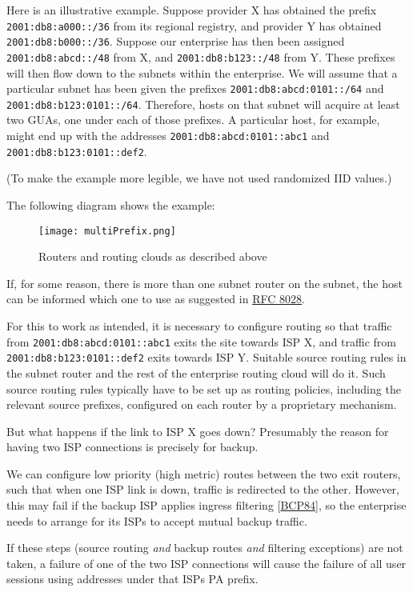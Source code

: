 \documentclass[
]{article}
\begin{document}
Here is an illustrative example. Suppose provider X has obtained the
prefix \texttt{2001:db8:a000::/36} from its regional registry, and
provider Y has obtained \texttt{2001:db8:b000::/36}. Suppose our
enterprise has then been assigned \texttt{2001:db8:abcd::/48} from X,
and \texttt{2001:db8:b123::/48} from Y. These prefixes will then flow
down to the subnets within the enterprise. We will assume that a
particular subnet has been given the prefixes
\texttt{2001:db8:abcd:0101::/64} and \texttt{2001:db8:b123:0101::/64}.
Therefore, hosts on that subnet will acquire at least two GUAs, one
under each of those prefixes. A particular host, for example, might end
up with the addresses \texttt{2001:db8:abcd:0101::abc1} and
\texttt{2001:db8:b123:0101::def2}.

(To make the example more legible, we have not used randomized IID
values.)

The following diagram shows the example:

\begin{figure}
\centering
\texttt{[image: multiPrefix.png]}
\caption{Routers and routing clouds as described above}
\end{figure}

If, for some reason, there is more than one subnet router on the subnet,
the host can be informed which one to use as suggested in
\href{https://www.rfc-editor.org/info/rfc8028}{RFC 8028}.

For this to work as intended, it is necessary to configure routing so
that traffic from \texttt{2001:db8:abcd:0101::abc1} exits the site
towards ISP X, and traffic from \texttt{2001:db8:b123:0101::def2} exits
towards ISP Y. Suitable source routing rules in the subnet router and
the rest of the enterprise routing cloud will do it. Such source routing
rules typically have to be set up as routing policies, including the
relevant source prefixes, configured on each router by a proprietary
mechanism.

But what happens if the link to ISP X goes down? Presumably the reason
for having two ISP connections is precisely for backup.

We can configure low priority (high metric) routes between the two exit
routers, such that when one ISP link is down, traffic is redirected to
the other. However, this may fail if the backup ISP applies ingress
filtering {[}\href{https://www.rfc-editor.org/info/bcp84}{BCP84}{]}, so
the enterprise needs to arrange for its ISPs to accept mutual backup
traffic.

If these steps (source routing \emph{and} backup routes \emph{and}
filtering exceptions) are not taken, a failure of one of the two ISP
connections will cause the failure of all user sessions using addresses
under that ISP\textquotesingle s PA prefix.
\end{document}
